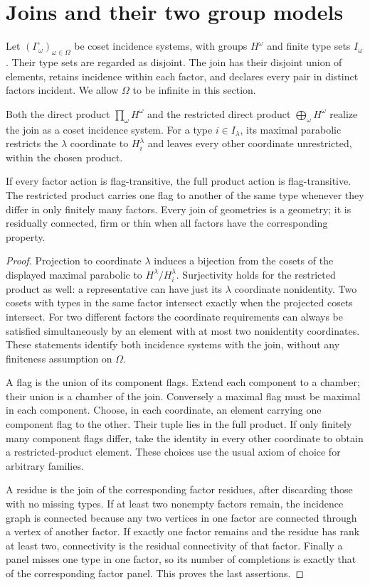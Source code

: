 \section{Joins and their two group models}
Let $(\Gamma_\omega)_{\omega\in\Omega}$ be coset incidence systems,
with groups $H^\omega$ and finite type sets $I_\omega$. Their type sets
are regarded as disjoint. The join has their disjoint union of elements,
retains incidence within each factor, and declares every pair in distinct
factors incident. We allow $\Omega$ to be infinite in this section.

\begin{proposition}\label{prop:joins}
Both the direct product $\prod_\omega H^\omega$ and the restricted
direct product $\bigoplus_\omega H^\omega$ realize the join as a coset
incidence system. For a type $i\in I_\lambda$, its maximal parabolic
restricts the $\lambda$ coordinate to $H_i^\lambda$ and leaves every
other coordinate unrestricted, within the chosen product.

If every factor action is flag-transitive, the full product action is
flag-transitive. The restricted product carries one flag to another of
the same type whenever they differ in only finitely many factors. Every
join of geometries is a geometry; it is residually connected, firm or
thin when all factors have the corresponding property.
\end{proposition}
\begin{proof}
Projection to coordinate $\lambda$ induces a bijection from the cosets
of the displayed maximal parabolic to $H^\lambda/H_i^\lambda$.
Surjectivity holds for the restricted product as well: a representative
can have just its $\lambda$ coordinate nonidentity. Two cosets with
types in the same factor intersect exactly when the projected cosets
intersect. For two different factors the coordinate requirements can
always be satisfied simultaneously by an element with at most two
nonidentity coordinates. These statements identify both incidence
systems with the join, without any finiteness assumption on $\Omega$.

A flag is the union of its component flags. Extend each component to
a chamber; their union is a chamber of the join. Conversely a maximal
flag must be maximal in each component. Choose, in each coordinate,
an element carrying one component flag to the other. Their tuple lies
in the full product. If only finitely many component flags differ, take
the identity in every other coordinate to obtain a restricted-product
element. These choices use the usual axiom of choice for arbitrary
families.

A residue is the join of the corresponding factor residues, after
discarding those with no missing types. If at least two nonempty factors
remain, the incidence graph is connected because any two vertices in
one factor are connected through a vertex of another factor. If exactly
one factor remains and the residue has rank at least two, connectivity
is the residual connectivity of that factor. Finally a panel misses
one type in one factor, so its number of completions is exactly that of
the corresponding factor panel. This proves the last assertions.
\end{proof}

